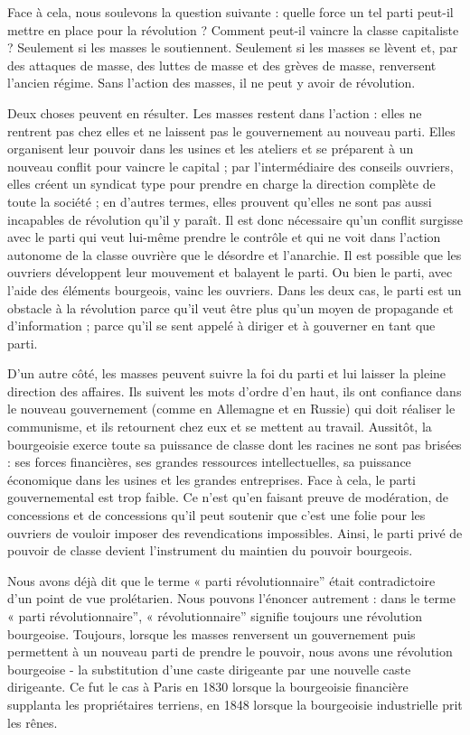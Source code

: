 Face à cela, nous soulevons la question suivante : quelle force un tel parti peut-il mettre en place pour la révolution ? Comment peut-il vaincre la classe capitaliste ? Seulement si les masses le soutiennent. Seulement si les masses se lèvent et, par des attaques de masse, des luttes de masse et des grèves de masse, renversent l'ancien régime. Sans l'action des masses, il ne peut y avoir de révolution.

Deux choses peuvent en résulter. Les masses restent dans l'action : elles ne rentrent pas chez elles et ne laissent pas le gouvernement au nouveau parti. Elles organisent leur pouvoir dans les usines et les ateliers et se préparent à un nouveau conflit pour vaincre le capital ; par l'intermédiaire des conseils ouvriers, elles créent un syndicat type pour prendre en charge la direction complète de toute la société ; en d'autres termes, elles prouvent qu'elles ne sont pas aussi incapables de révolution qu'il y paraît. Il est donc nécessaire qu'un conflit surgisse avec le parti qui veut lui-même prendre le contrôle et qui ne voit dans l'action autonome de la classe ouvrière que le désordre et l'anarchie. Il est possible que les ouvriers développent leur mouvement et balayent le parti. Ou bien le parti, avec l'aide des éléments bourgeois, vainc les ouvriers. Dans les deux cas, le parti est un obstacle à la révolution parce qu'il veut être plus qu'un moyen de propagande et d'information ; parce qu'il se sent appelé à diriger et à gouverner en tant que parti.

D'un autre côté, les masses peuvent suivre la foi du parti et lui laisser la pleine direction des affaires. Ils suivent les mots d’ordre d’en haut, ils ont confiance dans le nouveau gouvernement (comme en Allemagne et en Russie) qui doit réaliser le communisme, et ils retournent chez eux et se mettent au travail. Aussitôt, la bourgeoisie exerce toute sa puissance de classe dont les racines ne sont pas brisées : ses forces financières, ses grandes ressources intellectuelles, sa puissance économique dans les usines et les grandes entreprises. Face à cela, le parti gouvernemental est trop faible. Ce n’est qu’en faisant preuve de modération, de concessions et de concessions qu’il peut soutenir que c’est une folie pour les ouvriers de vouloir imposer des revendications impossibles. Ainsi, le parti privé de pouvoir de classe devient l’instrument du maintien du pouvoir bourgeois.

Nous avons déjà dit que le terme « parti révolutionnaire'' était contradictoire d'un point de vue prolétarien. Nous pouvons l'énoncer autrement : dans le terme « parti révolutionnaire'', « révolutionnaire'' signifie toujours une révolution bourgeoise. Toujours, lorsque les masses renversent un gouvernement puis permettent à un nouveau parti de prendre le pouvoir, nous avons une révolution bourgeoise - la substitution d'une caste dirigeante par une nouvelle caste dirigeante. Ce fut le cas à Paris en 1830 lorsque la bourgeoisie financière supplanta les propriétaires terriens, en 1848 lorsque la bourgeoisie industrielle prit les rênes.

